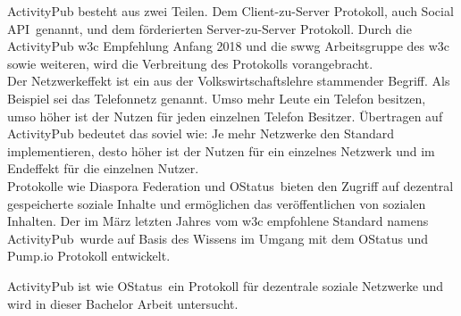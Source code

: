 {	ActivityPub besteht aus zwei Teilen. Dem Client-zu-Server Protokoll, auch \glqq Social API\grqq~genannt, und dem förderierten Server-zu-Server Protokoll. Durch die ActivityPub \gls{w3c} Empfehlung Anfang 2018 und die \gls{swwg} Arbeitsgruppe des \gls{w3c} sowie weiteren, wird die Verbreitung des Protokolls vorangebracht.\\
	
	Der Netzwerkeffekt ist ein aus der Volkswirtschaftslehre stammender Begriff. Als Beispiel sei das Telefonnetz genannt. Umso mehr Leute ein Telefon besitzen, umso höher ist der Nutzen für jeden einzelnen Telefon Besitzer\cite{netzwerkeffekt}. Übertragen auf ActivityPub bedeutet das soviel wie: \glqq Je mehr Netzwerke den Standard implementieren, desto höher ist der Nutzen für ein einzelnes Netzwerk und im Endeffekt für die einzelnen Nutzer\grqq.\\
	
	
	Protokolle wie \glqq Diaspora Federation und OStatus\grqq~bieten den Zugriff auf dezentral gespeicherte soziale Inhalte und ermöglichen das veröffentlichen von sozialen Inhalten. Der im März letzten Jahres vom \gls{w3c} empfohlene Standard namens \glqq ActivityPub\grqq~wurde auf Basis des Wissens im Umgang mit dem OStatus und Pump.io Protokoll entwickelt\cite{activityPub}.\\ 
	
	ActivityPub ist wie \glqq OStatus\grqq~ein Protokoll für dezentrale soziale Netzwerke und wird in dieser Bachelor Arbeit untersucht.
}

